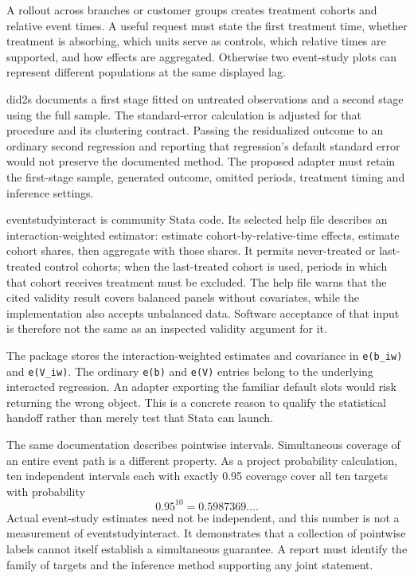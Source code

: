 A rollout across branches or customer groups creates treatment cohorts and
relative event times. A useful request must state the first treatment time,
whether treatment is absorbing, which units serve as controls, which relative
times are supported, and how effects are aggregated. Otherwise two event-study
plots can represent different populations at the same displayed lag.

did2s documents a first stage fitted on untreated observations and a second
stage using the full sample. The standard-error calculation is adjusted for
that procedure and its clustering contract. Passing the residualized outcome
to an ordinary second regression and reporting that regression's default
standard error would not preserve the documented method. The proposed adapter
must retain the first-stage sample, generated outcome, omitted periods,
treatment timing and inference settings.\cite{did2s}

eventstudyinteract is community Stata code. Its selected help file describes
an interaction-weighted estimator: estimate cohort-by-relative-time effects,
estimate cohort shares, then aggregate with those shares. It permits
never-treated or last-treated control cohorts; when the last-treated cohort
is used, periods in which that cohort receives treatment must be excluded.
The help file warns that the cited validity result covers balanced panels
without covariates, while the implementation also accepts unbalanced data.
Software acceptance of that input is therefore not the same as an inspected
validity argument for it.\cite{eventstudyinteract}

The package stores the interaction-weighted estimates and covariance in
\texttt{e(b\_iw)} and \texttt{e(V\_iw)}. The ordinary \texttt{e(b)} and
\texttt{e(V)} entries belong to the underlying interacted regression. An
adapter exporting the familiar default slots would risk returning the wrong
object. This is a concrete reason to qualify the statistical handoff rather
than merely test that Stata can launch.

The same documentation describes pointwise intervals. Simultaneous coverage
of an entire event path is a different property. As a project probability
calculation, ten independent intervals each with exactly 0.95 coverage cover
all ten targets with probability
\[
 0.95^{10}=0.5987369\ldots.
\]
Actual event-study estimates need not be independent, and this number is not
a measurement of eventstudyinteract. It demonstrates that a collection of
pointwise labels cannot itself establish a simultaneous guarantee. A report
must identify the family of targets and the inference method supporting any
joint statement.

